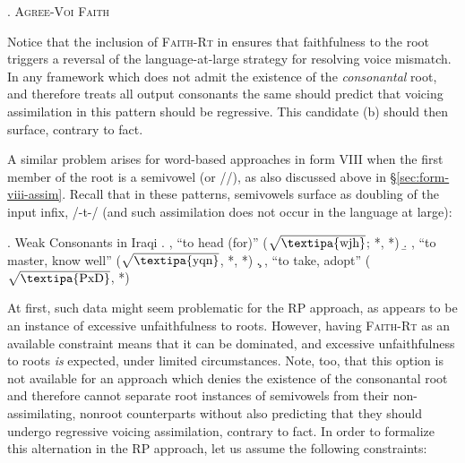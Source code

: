 \documentclass[12pt,twoside,letterpaper]{article}
\begin{document}
\ex. \textsc{Agree-Voi} \OTdom \textsc{Faith}\\\begin{OTtableau}{3}
\end{OTtableau}

Notice that the inclusion of \textsc{Faith-Rt} in \Last ensures that faithfulness to the root triggers a reversal of the language-at-large strategy for resolving voice mismatch. In any framework which does not admit the existence of the \emph{consonantal} root, and therefore treats all output consonants the same should predict that voicing assimilation in this pattern should be regressive. This candidate (b) should then surface, contrary to fact.

A similar problem arises for word-based approaches in form VIII when the first member of the root is a semivowel (or //), as also discussed above in \S{\ref{sec:form-viii-assim}}. Recall that in these patterns, semivowels surface as doubling of the input infix, /-t-/ (and such assimilation does not occur in the language at large):

\ex. Weak Consonants in Iraqi \citep[p.74]{erwin04}
\a. , ``to head (for)'' ($\sqrt{\textrm{\textipa{wjh}}}$; *, *)
\b. , ``to master, know well'' ($\sqrt{\textrm{\textipa{yqn}}}$, *, *)
\c. , ``to take, adopt'' ($\sqrt{\textrm{\textipa{PxD}}}$, *)

At first, such data might seem problematic for the RP approach, as \Last appears to be an instance of excessive unfaithfulness to roots. However, having \textsc{Faith-Rt} as an available constraint means that it can be dominated, and excessive unfaithfulness to roots \emph{is} expected, under limited circumstances. Note, too, that this option is not available for an approach which denies the existence of the consonantal root and therefore cannot separate root instances of semivowels from their non-assimilating, nonroot counterparts without also predicting that they should undergo regressive voicing assimilation, contrary to fact. In order to formalize this alternation in the RP approach, let us assume the following constraints:
\end{document}
